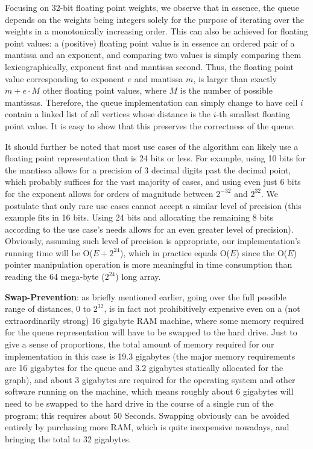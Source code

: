 \documentclass[conference,10pt,twocolumn]{IEEEtran}
\begin{document}
Focusing on 32-bit floating point weights, we observe that in essence, the queue depends on the weights being integers solely for the purpose of iterating over the weights in a monotonically increasing order. This can also be achieved for floating point values: a (positive) floating point value is in essence an ordered pair of a mantissa and an exponent, and comparing two values is simply comparing them lexicographically, exponent first and mantissa second. Thus, the floating point value corresponding to exponent $e$ and mantissa $m$, is larger than exactly $m + e \cdot M$ other floating point values, where $M$ is the number of possible mantissas. Therefore, the queue implementation can simply change to have cell $i$ contain a linked list of all vertices whose distance is the $i$-th smallest floating point value. It is easy to show that this preserves the correctness of the queue.

It should further be noted that most use cases of the algorithm can likely use a floating point representation that is 24 bits or less. For example, using 10 bits for the mantissa allows for a precision of 3 decimal digits past the decimal point, which probably suffices for the vast majority of cases, and using even just 6 bits for the exponent allows for orders of magnitude between $2^{-32}$ and $2^{32}$. We postulate that only rare use cases cannot accept a similar level of precision (this example fits in 16 bits. Using 24 bits and allocating the remaining 8 bits according to the use case's needs allows for an even greater level of precision). Obviously, assuming such level of precision is appropriate, our implementation's running time will be O($E + 2^{24}$), which in practice equals O($E$) since the O($E$) pointer manipulation operation is more meaningful in time consumption than reading the 64 mega-byte ($2^{24}$) long array.

{\bf Swap-Prevention}: as briefly mentioned earlier, going over the full possible range of distances, 0 to $2^{32}$, is in fact not prohibitively expensive even on a (not extraordinarily strong) 16 gigabyte RAM machine, where some memory required for the queue representation will have to be swapped to the hard drive. Just to give a sense of proportions, the total amount of memory required for our implementation in this case is 19.3 gigabytes (the major memory requirements are 16 gigabytes for the queue and 3.2 gigabytes statically allocated for the graph), and about 3 gigabytes are required for the operating system and other software running on the machine, which means roughly about 6 gigabytes will need to be swapped to the hard drive in the course of a single run of the program;  this requires about 50 Seconds. Swapping obviously can be avoided entirely by purchasing more RAM, which is quite inexpensive nowadays, and bringing the total to 32 gigabytes.
\end{document}
